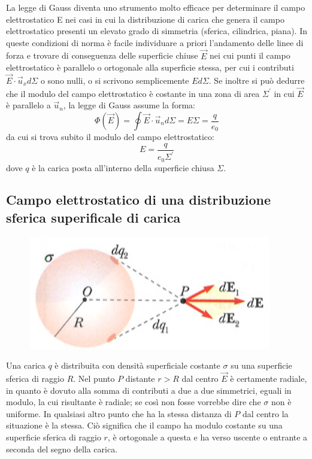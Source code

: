 \documentclass[class=book, crop=false, oneside, 12pt]{standalone}
\begin{document}
La legge di Gauss diventa uno strumento molto efficace per determinare il campo elettrostatico E nei casi in cui la distribuzione di carica che genera il campo elettrostatico presenti un elevato grado di simmetria (sferica, cilindrica, piana).
In queste condizioni di norma è facile individuare a priori l'andamento delle linee di forza e trovare di conseguenza delle superficie chiuse \(\overrightarrow{E}\) nei cui punti il campo elettrostatico è parallelo o ortogonale alla superficie stessa, per cui i contributi \(\overrightarrow{E} \cdot \overrightarrow{u}_x d \Sigma\) o sono nulli, o si scrivono semplicemente \(E d \Sigma\). 
Se inoltre si può dedurre che il modulo del campo elettrostatico è costante in una zona di area \(\Sigma^{\prime}\) in cui \(\overrightarrow{E}\) è parallelo a \(\overrightarrow{u}_n\), la legge di Gauss assume la forma:
\begin{equation*}
    \Phi (\overrightarrow{E}) = \oint \overrightarrow{E} \cdot \overrightarrow{u}_n d \Sigma = E \Sigma = \frac{q}{e_0}
\end{equation*}
da cui si trova subito il modulo del campo elettrostatico: 
\begin{equation*}
    E = \frac{q}{e_0 \Sigma^{\prime}}
\end{equation*}
dove \(q\) è la carica posta all'interno della superficie chiusa \(\Sigma\). 

\subsection{Campo elettrostatico di una distribuzione sferica superificale di carica}

\begin{figure}[h]
    \includegraphics[scale=0.4]{sfera_superficiale.png}
    \centering
    \caption{}
\end{figure}

Una carica \(q\) è distribuita con densità superficiale costante \(\sigma\) su una superficie sferica di raggio \(R\).  
Nel punto \(P\) distante \(r > R\) dal centro \(\overrightarrow{E}\) è certamente radiale, in quanto è dovuto alla somma di contributi a due a due simmetrici, eguali in modulo, la cui risultante è radiale; se così non fosse vorrebbe dire che \(\sigma\) non è uniforme.  
In qualsiasi altro punto che ha la stessa distanza di \(P\) dal centro la situazione è la stessa. 
Ciò significa che il campo ha modulo costante su una superficie sferica di raggio \(r\), è  ortogonale a questa e ha verso uscente o entrante a seconda del segno della carica.
\end{document}

